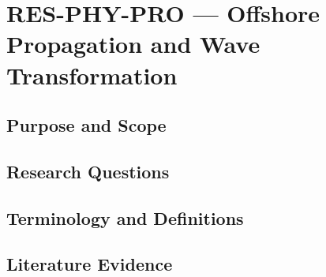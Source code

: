 
\section{RES-PHY-PRO --- Offshore Propagation and Wave Transformation}
\label{sec:res-phy-pro}

\subsection{Purpose and Scope}
\label{sec:res-phy-pro-purpose}


\subsection{Research Questions}
\label{sec:res-phy-pro-research-questions}


\subsection{Terminology and Definitions}
\label{sec:res-phy-pro-definitions}


\subsection{Literature Evidence}
\label{sec:res-phy-pro-literature-evidence}

%

